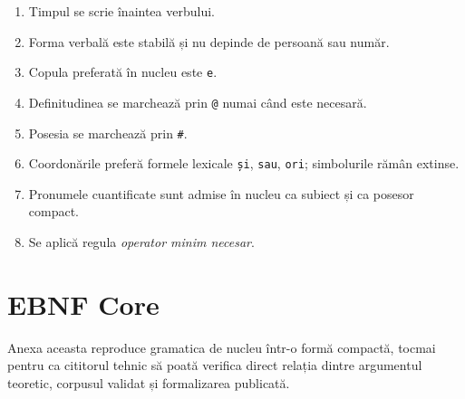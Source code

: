 \documentclass[12pt,onecolumn,letterpaper]{article}
\newcommand{\rs}[1]{\texttt{#1}}
\begin{document}
\begin{enumerate}[leftmargin=*]
\item Timpul se scrie înaintea verbului.
\item Forma verbală este stabilă și nu depinde de persoană sau număr.
\item Copula preferată în nucleu este \rs{e}.
\item Definitudinea se marchează prin \rs{@} numai când este necesară.
\item Posesia se marchează prin \rs{\#}.
\item Coordonările preferă formele lexicale \rs{și}, \rs{sau}, \rs{ori}; simbolurile rămân extinse.
\item Pronumele cuantificate sunt admise în nucleu ca subiect și ca posesor compact.
\item Se aplică regula \textit{operator minim necesar}.
\end{enumerate}

\section{EBNF Core}

Anexa aceasta reproduce gramatica de nucleu într-o formă compactă, tocmai pentru
ca cititorul tehnic să poată verifica direct relația dintre argumentul teoretic,
corpusul validat și formalizarea publicată.
\end{document}
